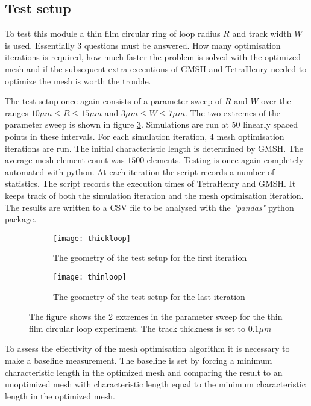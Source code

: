 \subsection{Test setup}
To test this module a thin film circular ring of loop radius $R$ and track width $W$ is used. Essentially 3 questions must be answered. How many optimisation iterations is required, how much faster the problem is solved with the optimized mesh and if the subsequent extra executions of GMSH and TetraHenry needed to optimize the mesh is worth the trouble. \par
The test setup once again consists of a parameter sweep of $R$ and $W$ over the ranges $10 \mu m \le R \le 15 \mu m $ and $  3 \mu m \le W \le7\mu m$. The two extremes of the parameter sweep is shown in figure \ref{fig:testloop}. Simulations are run at 50 linearly spaced points in these intervals. For each simulation iteration, 4 mesh optimisation iterations are run. The initial characteristic length is determined by GMSH. The average mesh element count was $1500$ elements. Testing is once again completely automated with python. At each iteration the script records a number of statistics. The script records the execution times of TetraHenry and GMSH. It keeps track of both the simulation iteration and the mesh optimisation iteration. The results are written to a CSV file to be analysed with the \textit{"pandas"} python package. 
\begin{figure}[H]
    \centering
    \begin{subfigure}[b]{0.48\textwidth}
        \centering
        \texttt{[image: thickloop]}
        \caption{The geometry of the test setup for the first iteration}
        \label{fig:thickloop}
    \end{subfigure}
    \hfill
    \begin{subfigure}[b]{0.48\textwidth}
        \centering
        \texttt{[image: thinloop]}
        \caption{The geometry of the test setup for the last iteration}
        \label{fig:thinloop}
    \end{subfigure}
    \caption{The figure shows the 2 extremes in the parameter sweep for the thin film circular loop experiment. The track thickness is set to $0.1 \mu m$}
    \label{fig:testloop}
\end{figure}
To assess the effectivity of the mesh optimisation algorithm it is necessary to make a baseline measurement. The baseline is set by forcing a minimum characteristic length in the optimized mesh and comparing the result to an unoptimized mesh with characteristic length equal to the minimum characteristic length in the optimized mesh.

